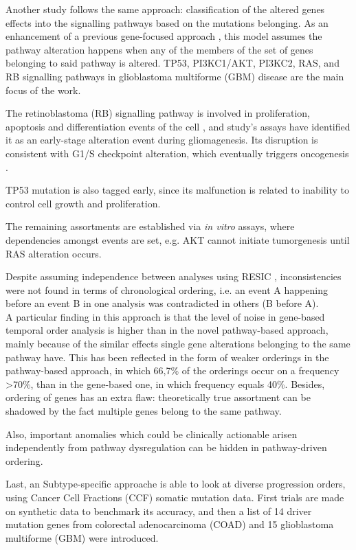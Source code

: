 Another study \cite{Cheng2012AGliomagenesis} follows the same approach: classification of the altered genes effects into the signalling pathways based on the mutations belonging. As an enhancement of a previous gene-focused approach \cite{Attolini2010ACancer}, this model assumes the pathway alteration happens when any of the members of the set of genes belonging to said pathway is altered. TP53, PI3KC1/AKT, PI3KC2, RAS, and RB signalling pathways in glioblastoma multiforme (GBM) disease are the main focus of the work.

The retinoblastoma (RB) signalling pathway is involved in proliferation, apoptosis and differentiation events of the cell \cite{Du2012TheTherapeutics}, and study's assays have identified it as an early-stage alteration event during gliomagenesis. Its disruption is consistent with G1/S checkpoint alteration, which eventually triggers oncogenesis \cite{Bertoli2013ControlPhases}.

TP53 mutation is also tagged early, since its malfunction is related to inability to control cell growth and proliferation.

The remaining assortments are established via \emph{in vitro} assays, where dependencies amongst events are set, e.g. AKT cannot initiate tumorgenesis until RAS alteration occurs.

Despite assuming independence between analyses using RESIC \cite{Attolini2010ACancer}, inconsistencies were not found in terms of chronological ordering, i.e. an event A happening before an event B in one analysis was contradicted in others (B before A).
\\

A particular finding in this approach is that the level of noise in gene-based temporal order analysis is higher than in the novel pathway-based approach, mainly because of the similar effects single gene alterations belonging to the same pathway have. This has been reflected in the form of weaker orderings in the pathway-based approach, in which 66,7\% of the orderings occur on a frequency >70\%, than in the gene-based one, in which frequency equals 40\%. Besides, ordering of genes has an extra flaw: theoretically true assortment can be shadowed by the fact multiple genes belong to the same pathway.

Also, important anomalies which could be clinically actionable arisen independently from pathway dysregulation can be hidden in pathway-driven ordering.

Last, an Subtype-specific approache \cite{Khakabimamaghani2019UncoveringDysregulation} is able to look at diverse progression orders, using Cancer Cell Fractions (CCF) somatic mutation data. First trials are made on synthetic data to benchmark its accuracy, and then a list of 14 driver mutation genes from colorectal adenocarcinoma (COAD) and 15 glioblastoma multiforme (GBM) were introduced.

